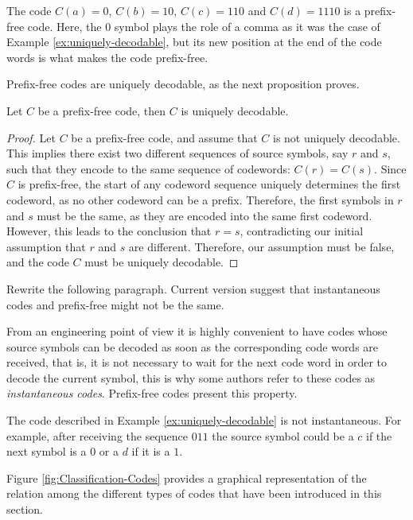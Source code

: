 \begin{example}
\label{ex:prefix-free}
The code $C(a)=0$, $C(b)=10$, $C(c)=110$ and $C(d)=1110$ is a prefix-free code. Here, the $0$ symbol plays the role of a comma as it was the case of Example \ref{ex:uniquely-decodable}, but its new position at the end of the code words is what makes the code prefix-free.
\end{example}

Prefix-free codes are uniquely decodable, as the next proposition proves.

\begin{proposition}
Let $C$ be a prefix-free code, then $C$ is uniquely decodable.
\end{proposition}
\begin{proof}
Let \( C \) be a prefix-free code, and assume that \( C \) is not uniquely decodable. This implies there exist two different sequences of source symbols, say \( r \) and \( s \), such that they encode to the same sequence of codewords: \( C(r) = C(s) \). Since \( C \) is prefix-free, the start of any codeword sequence uniquely determines the first codeword, as no other codeword can be a prefix. Therefore, the first symbols in \( r \) and \( s \) must be the same, as they are encoded into the same first codeword. However, this leads to the conclusion that \( r = s \), contradicting our initial assumption that \( r \) and \( s \) are different. Therefore, our assumption must be false, and the code \( C \) must be uniquely decodable. 
\end{proof}

{\color{red} Rewrite the following paragraph. Current version suggest that instantaneous codes and prefix-free might not be the same.}

From an engineering point of view it is highly convenient to have codes whose source symbols can be decoded as soon as the corresponding code words are received, that is, it is not necessary to wait for the next code word in order to decode the current symbol, this is why some authors refer to these codes as \emph{instantaneous codes}. Prefix-free codes present this property.

\begin{example}
The code described in Example \ref{ex:uniquely-decodable} is not instantaneous. For example, after receiving the sequence $011$ the source symbol could be a $c$ if the next symbol is a $0$ or a $d$ if it is a $1$.
\end{example}

Figure \ref{fig:Classification-Codes} provides a graphical representation of the relation among the different types of codes that have been introduced in this section.

